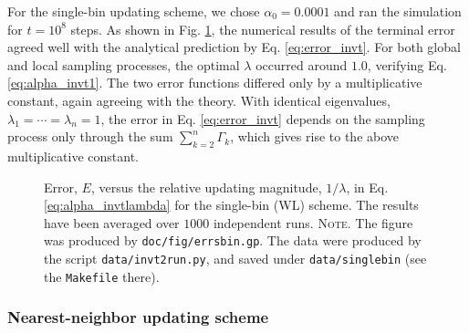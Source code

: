 \documentclass[reprint, floatfix]{revtex4-1}
\newcommand{\note}[1]{{\color{DarkGreen}\footnotesize \textsc{Note.} #1}}
\begin{document}
For the single-bin updating scheme,
we chose $\alpha_0 = 0.0001$
and ran the simulation for $t = 10^8$ steps.
%
As shown in Fig. \ref{fig:errsbin},
the numerical results of the terminal error agreed well with
the analytical prediction by Eq. \eqref{eq:error_invt}.
%
For both global and local sampling processes,
the optimal $\lambda$ occurred around $1.0$,
verifying Eq. \eqref{eq:alpha_invt1}.
%
%
The two error functions
differed only by a multiplicative constant,
again agreeing with the theory.
%
With identical eigenvalues,
$\lambda_1 = \cdots = \lambda_n = 1$,
the error in Eq. \eqref{eq:error_invt}
depends on the sampling process only through
the sum $\sum_{ k = 2 }^n \Gamma_k$,
which gives rise to the above multiplicative constant.


\begin{figure}[h]
\begin{center}
  \caption{
    \label{fig:errsbin}
    Error, $E$, versus the
    relative updating magnitude,
    $1/\lambda$,
    in Eq. \eqref{eq:alpha_invtlambda}
    for the single-bin (WL) scheme.
    The results have been averaged over $1000$ independent runs.
    \note{The figure was produced by \texttt{doc/fig/errsbin.gp}.
      The data were produced by the script \texttt{data/invt2run.py},
      and saved under \texttt{data/singlebin}
      (see the \texttt{Makefile} there).
    }
  }
\end{center}
\end{figure}



\subsubsection{Nearest-neighbor updating scheme}
\end{document}
